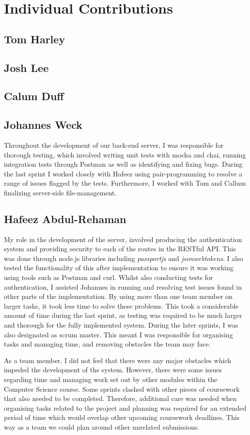 \section{Individual Contributions}
\subsection{Tom Harley}
\subsection{Josh Lee}
\subsection{Calum Duff}
\subsection{Johannes Weck}
Throughout the development of our back-end server, I was responsible for thorough testing, which involved writing unit tests with mocha and chai, running integration tests through Postman as well as identifying and fixing bugs. During the last sprint I worked closely with Hafeez using pair-programming to resolve a range of issues flagged by the tests. Furthermore, I worked with Tom and Callum finalizing server-side file-management.
\subsection{Hafeez Abdul-Rehaman}
My role in the development of the server, involved producing the authentication system and providing security to each of the routes in the RESTful API. This was done through node.js libraries including \textit{passportjs} and \textit{jsonwebtokens}. I also tested the functionality of this after implementation to ensure it was working using tools such as Postman and curl. Whilst also conducting tests for authentication, I assisted Johannes in running and resolving test issues found in other parts of the implementation. By using more than one team member on larger tasks, it took less time to solve these problems. This took a considerable amount of time during the last sprint, as testing was required to be much larger and thorough for the fully implemented system. During the later sprints, I was also designated as scrum master. This meant I was responsible for organising tasks and managing time, and removing obstacles the team may face. 

As a team member, I did not feel that there were any major obstacles which impeded the development of the system. However, there were some issues regarding time and managing work set out by other modules within the Computer Science course. Some sprints clashed with other pieces of coursework that also needed to be completed. Therefore, additional care was needed when organising tasks related to the project and planning was required for an extended period of time which would overlap other upcoming coursework deadlines. This way as a team we could plan around other unrelated submissions.
